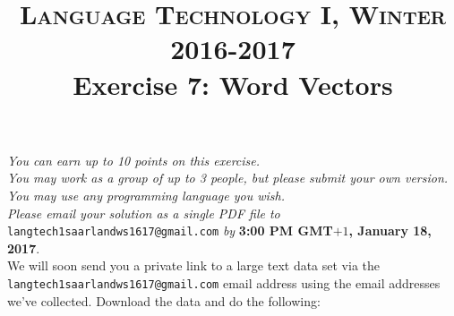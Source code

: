 \documentclass[paper=a4, fontsize=11pt]{scrartcl} %
\title{	
\vspace{-1.1cm}
\normalfont \normalsize 
\textsc{Language Technology I, Winter 2016-2017} \\ [25pt] %
\huge Exercise 7: Word Vectors \\ %
}
\date{} %
\numberwithin{equation}{section} %
\numberwithin{figure}{section} %
\numberwithin{table}{section} %
\begin{document}
\maketitle %


\vspace{-2cm}
\textit{You can earn up to 10 points on this exercise.\\
You may work as a group of up to 3 people, but please submit your own version.\\
You may use any programming language you wish.}\\

\textit{Please email your solution as a single PDF file to} \texttt{langtech1saarlandws1617@gmail.com} \textit{by} \textbf{3:00 PM GMT$+1$, January 18, 2017}.\\



We will soon send you a private link to a large text data set via the
\texttt{langtech1saarlandws1617@gmail.com} email address using the
email addresses we've collected.  Download the data and do the
following:
\end{document}
